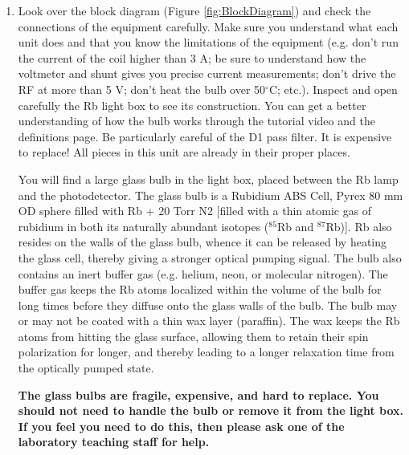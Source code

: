 \documentclass{../lab}
\begin{document}
\begin{enumerate}
    \item Look over the block diagram (Figure \ref{fig:BlockDiagram}) and check the connections of the equipment carefully.  Make sure you understand what each unit does and that you know the limitations of the equipment (e.g. don't run the current of the coil higher than 3 A; be sure to understand how the voltmeter and shunt gives you precise current measurements; don't drive the RF at more than 5 V; don't heat the bulb over 50$^\circ$C; etc.).  Inspect and open carefully the Rb light box to see its construction. You can get a better understanding of how the bulb works through the tutorial video and the definitions page. Be particularly careful of the D1 pass filter. It is expensive to replace! All pieces in this unit are already in their proper places.

    You will find a large glass bulb in the light box, placed between the Rb lamp and the photodetector. The glass bulb is a Rubidium ABS Cell, Pyrex 80 mm OD sphere filled with Rb + 20 Torr N2 [filled with a thin atomic gas of rubidium in both its naturally abundant isotopes ($^{85}$Rb and $^{87}$Rb)]. Rb also resides on the walls of the glass bulb, whence it can be released by heating the glass cell, thereby giving a stronger optical pumping signal. The bulb also contains an inert buffer gas (e.g. helium, neon, or molecular nitrogen). The buffer gas keeps the Rb atoms localized within the volume of the bulb for long times before they diffuse onto the glass walls of the bulb. The bulb may or may not be coated with a thin wax layer (paraffin). The wax keeps the Rb atoms from hitting the glass surface, allowing them to retain their spin polarization for longer, and thereby leading to a longer relaxation time from the optically pumped state.

    \textbf{The glass bulbs are fragile, expensive, and hard to replace. You should not need to handle the bulb or remove it from the light box. If you feel you need to do this, then please ask one of the laboratory teaching staff for help.}


\end{enumerate}
\end{document}
